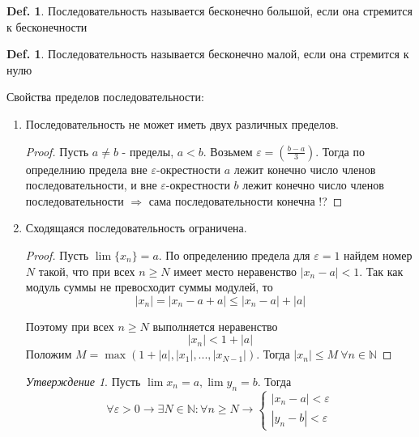 \documentclass[12pt]{article}
\newenvironment{MyList}[1][4pt]{
  \begin{enumerate}[1.]
  \setlength{\parskip}{0pt}
  \setlength{\itemsep}{#1}
}{       
  \end{enumerate}
}
\def\N{\mathbb{N}}       %
\theoremstyle{definition} %
\newtheorem{Def}[Thm]{Def.} %
\theoremstyle{remark} %
\newtheorem{Prop}[Thm]{Утверждение} %
\begin{document}
\begin{Def}
    Последовательность называется бесконечно большой, если она стремится к бесконечности 
\end{Def}

\begin{Def}
    Последовательность называется бесконечно малой, если она стремится к нулю
\end{Def}

Свойства пределов последовательности:
\begin{MyList}
    \item Последовательность не может иметь двух различных пределов.
    
    \begin{proof}
        Пусть $a \neq b$ - пределы, $a < b$. Возьмем $\varepsilon = \left(\frac{b - a}{3}\right)$. Тогда по определнию предела вне $\varepsilon$-окрестности $a$ лежит конечно число членов последовательности, и
        вне $\varepsilon$-окрестности $b$ лежит конечно число членов последовательности $\Rightarrow$ сама последовательности конечна !?    
    \end{proof}
    \item Сходящаяся последовательность ограничена.
    \begin{proof}
        Пусть $\lim \{x_n\} = a$. По определению предела для $\varepsilon = 1$ найдем номер $N$ такой, что при всех $n \geqslant N$ имеет место неравенство $|x_n - a| < 1$.
        Так как модуль суммы не превосходит суммы модулей, то 
        \[|x_n| = |x_n - a + a| \leqslant |x_n - a| + |a|\]

        Поэтому при всех $n \geqslant N$ выполняется неравенство
        \[|x_n| < 1 + |a|\]
        Положим $M = \max(1 + |a|, |x_1|, ..., |x_{N - 1}|)$. Тогда $|x_n| \leqslant M \ \forall n \in \N$   
    \end{proof}

    \begin{Prop}
        Пусть $\lim x_n = a, \lim y_n = b$. Тогда $$\forall \varepsilon > 0 \to \exists N \in \N : \forall n \geqslant N \to \begin{cases}
            |x_n - a| < \varepsilon \\
            |y_n - b| < \varepsilon
        \end{cases}$$


\end{Prop}
\end{MyList}
\end{document}
